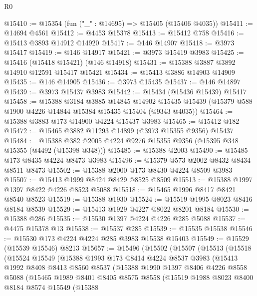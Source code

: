 \begin{lexlean}{R0}
\begin{coremodule}
@15410 := @15354 (fun ("_" : @14695) => @15405 (@15406 @4035))
@15411 := @14694 @4561
@15412 := @4453 @15378
@15413 := @15412 @758
@15416 := @15413 @3893 @14912 @14920
@15417 := @146 @14907
@15418 := @3973 @15417
@15419 := @146 @14917
@15421 := @3973 @15419 @3983
@15425 := @15416 (@15418 @15421) (@146 @14918)
@15431 := @15388 @3887 @3892 @14910 @12591 @15417 @15421
@15434 := @15413 @3886 @14903 @14909
@15435 := @146 @14905
@15436 := @3973 @15435
@15437 := @146 @14897
@15439 := @3973 @15437 @3983
@15442 := @15434 (@15436 @15439) @15417
@15458 := @15388
    @3184
    @3885
    @14845
    @14902
    @15435
    @15439
    (@15379 @588 @1900 @4226 @14844 @15384 @15435 @15404 (@9343 @4035))
@15464 := @15388 @3883 @173 @14900 @4224 @15437 @3983
@15465 := @15412 @182
@15472 := @15465 @3882 @11293 @14899 (@3973 @15355 @9356) @15437
@15484 := @15388 @382 @2005 @4224 @9276 @15355 @9356 (@15395 @348 @15355 (@4492 (@15398 @348)))
@15485 := @15388 @2003
@15490 := @15485 @173 @8435 @4224 @8473 @3983
@15496 := @15379 @573 @2002 @8432 @8434 @8511 @8473
@15502 := @15388 @2000 @173 @8430 @4224 @8509 @3983
@15507 := @15413 @1999 @8424 @8429 @8525 @8509
@15513 := @15388 @1997 @1397 @8422 @4226 @8523 @5088
@15518 := @15465 @1996 @8417 @8421 @8540 @8523
@15519 := @15388 @1930
@15524 := @15519 @1995 @8023 @8416 @8184 @8539
@15529 := @15413 @1929 @4227 @8022 @8201 @8184
@15530 := @15388 @286
@15535 := @15530 @1397 @4224 @4226 @285 @5088
@15537 := @4475 @15378 @13
@15538 := @15537 @285
@15539 := @15535 @15538
@15546 := @15530 @173 @4224 @4224 @285 @3983 @15538 @15403
@15549 := @15529 (@15539 @15546) @8213
@15657 := @15496
    (@15502
      (@15507
        (@15513
          (@15518
            (@15524
              @15549
              (@15388
                @1993
                @173
                @8414
                @4224
                @8537
                @3983
                (@15413
                  @1992
                  @8408
                  @8413
                  @8560
                  @8537
                  (@15388
                    @1990
                    @1397
                    @8406
                    @4226
                    @8558
                    @5088
                    (@15465
                      @1989
                      @8401
                      @8405
                      @8575
                      @8558
                      (@15519
                        @1988
                        @8023
                        @8400
                        @8184
                        @8574
                        @15549
                        (@15388

\end{coremodule}
\end{lexlean}
